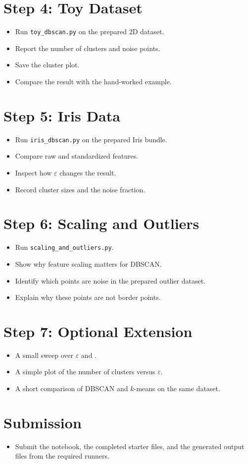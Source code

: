 \section*{Step 4: Toy Dataset}
\begin{itemize}
  \item Run \texttt{toy\_dbscan.py} on the prepared 2D dataset.
  \item Report the number of clusters and noise points.
  \item Save the cluster plot.
  \item Compare the result with the hand-worked example.
\end{itemize}

\section*{Step 5: Iris Data}
\begin{itemize}
  \item Run \texttt{iris\_dbscan.py} on the prepared Iris bundle.
  \item Compare raw and standardized features.
  \item Inspect how $\varepsilon$ changes the result.
  \item Record cluster sizes and the noise fraction.
\end{itemize}

\section*{Step 6: Scaling and Outliers}
\begin{itemize}
  \item Run \texttt{scaling\_and\_outliers.py}.
  \item Show why feature scaling matters for DBSCAN.
  \item Identify which points are noise in the prepared outlier dataset.
  \item Explain why these points are not border points.
\end{itemize}

\section*{Step 7: Optional Extension}
\begin{itemize}
  \item A small sweep over $\varepsilon$ and .
  \item A simple plot of the number of clusters versus $\varepsilon$.
  \item A short comparison of DBSCAN and $k$-means on the same dataset.
\end{itemize}
\section*{Submission}
\begin{itemize}
  \item Submit the notebook, the completed starter files, and the generated output files from the required runners.
\end{itemize}
